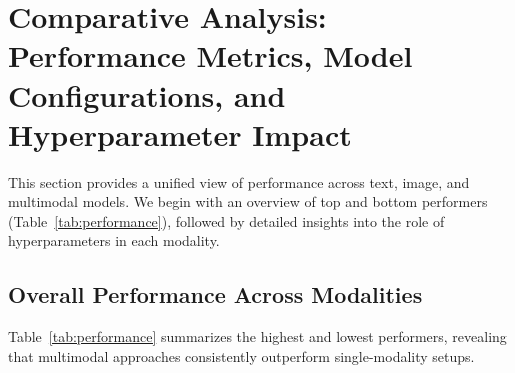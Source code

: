 \section{Comparative Analysis: Performance Metrics, Model Configurations, and Hyperparameter Impact}

This section provides a unified view of performance across text, image, and multimodal models. We begin with an overview of top and bottom performers (Table~\ref{tab:performance}), followed by detailed insights into the role of hyperparameters in each modality. 


\subsection{Overall Performance Across Modalities}


Table~\ref{tab:performance} summarizes the highest and lowest performers, revealing that multimodal approaches consistently outperform single-modality setups. 

\begin{table}[h]
    \centering
    \caption{Top and bottom performers across text, image, and multimodal settings.}
    \label{tab:performance}
\end{table}

